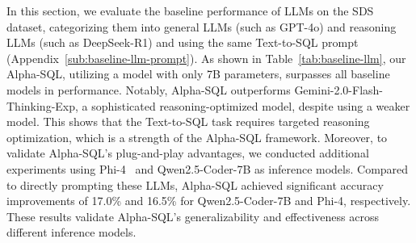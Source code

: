

In this section, we evaluate the baseline performance of LLMs on the SDS dataset, categorizing them into general LLMs (such as GPT-4o) and reasoning LLMs (such as DeepSeek-R1) and using the same Text-to-SQL prompt (Appendix~\ref{sub:baseline-llm-prompt}). 
As shown in Table~\ref{tab:baseline-llm},
our Alpha-SQL, utilizing a model with only 7B parameters, surpasses all baseline models in performance. Notably, Alpha-SQL outperforms Gemini-2.0-Flash-Thinking-Exp, a sophisticated reasoning-optimized model, despite using a weaker model. This shows that the Text-to-SQL task requires targeted reasoning optimization, which is a strength of the Alpha-SQL framework.
Moreover, to validate Alpha-SQL's plug-and-play advantages, we conducted additional experiments using Phi-4~\cite{phi-4} and Qwen2.5-Coder-7B as inference models. Compared to directly prompting these LLMs, Alpha-SQL achieved significant accuracy improvements of 17.0\% and 16.5\% for Qwen2.5-Coder-7B and Phi-4, respectively. These results validate Alpha-SQL's generalizability and effectiveness across different inference models.





